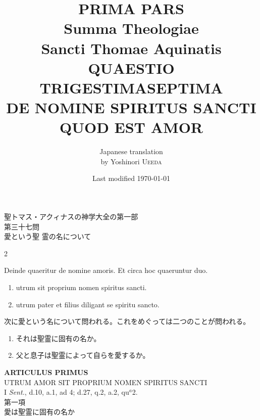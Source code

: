 \documentclass[paper=a4paper,fontsize=10pt,jafontsize=9pt,titlepage]{jlreq}
\title{{\bfseries PRIMA PARS}\\{\Huge Summa Theologiae}\\Sancti Thomae
Aquinatis\\{\sffamily QUAESTIO TRIGESTIMASEPTIMA}\\DE NOMINE SPIRITUS
SANCTI QUOD EST AMOR}
\author{Japanese translation\\by Yoshinori {\scshape Ueeda}}
\date{Last modified \today}
\begin{document}
\maketitle

\begin{center}
{\Large 聖トマス・アクィナスの神学大全の第一部\\第三十七問\\愛という聖
 霊の名について}
\end{center}

\thispagestyle{empty}
\begin{paracol}{2}

Deinde quaeritur de nomine amoris. Et circa hoc quaeruntur duo. 

\begin{enumerate}
 \item utrum sit proprium nomen spiritus sancti.
 \item utrum pater et filius diligant se spiritu sancto.
\end{enumerate}

\switchcolumn

次に愛という名について問われる。これをめぐっては二つのことが問われる。

\begin{enumerate}
 \item それは聖霊に固有の名か。
 \item 父と息子は聖霊によって自らを愛するか。
\end{enumerate}

\end{paracol}



\newpage


\begin{center}
{\Large {\bfseries ARTICULUS PRIMUS}}\\
{\large UTRUM AMOR SIT PROPRIUM NOMEN SPIRITUS SANCTI}\\
{\footnotesize I {\itshape Sent.}, d.10, a.1, ad 4; d.27, q.2, a.2, qu$^{a}$2.}\\
{\Large 第一項\\愛は聖霊に固有の名か}
\end{center}


{}
\setcounter{section}{1}
\setcounter{subsection}{0}
\end{document}
